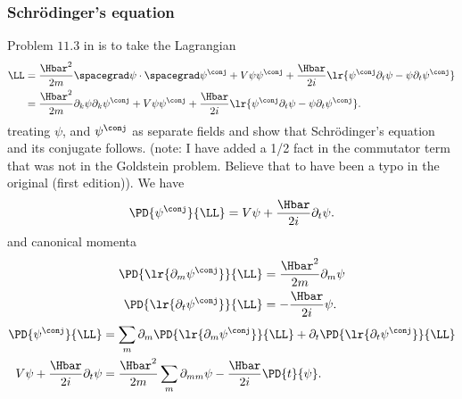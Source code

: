 %
%
%
\subsubsection{Schr\"{o}dinger's equation}
%
Problem \(11.3\) in \citep{goldstein1951cm} is to take the Lagrangian
%
\begin{equation}\label{eqn:fieldLagrangian:540}
\begin{aligned}
\LL
&= \frac{\Hbar^2}{2 m} \spacegrad \psi \cdot \spacegrad \psi^\conj + V \psi \psi^\conj + \frac{\Hbar}{2i}
\lr{  \psi^\conj \partial_t \psi - \psi \partial_t \psi^\conj  }
 \\
&= \frac{\Hbar^2}{2 m} \partial_k \psi \partial_k \psi^\conj + V \psi \psi^\conj +
\frac{\Hbar}{2i}
\lr{  \psi^\conj \partial_t \psi - \psi \partial_t \psi^\conj  }
 .
\end{aligned}
\end{equation}
%
treating \(\psi\), and \(\psi^\conj\) as separate fields and show that Schr\"{o}dinger's equation and its conjugate follows.  (note: I have added a 1/2 fact in the
commutator term that was not in the Goldstein problem.  Believe that to have been a typo in the original (first edition)).
%
We have
\begin{equation}\label{eqn:fieldLagrangian:560}
\PD{\psi^\conj}{\LL} = V\psi + \frac{\Hbar}{2i} \partial_t \psi .
\end{equation}
%
and canonical momenta
\begin{equation}\label{eqn:fieldLagrangian:580}
\begin{aligned}
\PD{
\lr{ \partial_m \psi^\conj }
}{\LL} &= \frac{\Hbar^2}{2 m} \partial_{m} \psi \\
\PD{
\lr{ \partial_t \psi^\conj }
}{\LL} &= -\frac{\Hbar}{2i} {\psi} .
\end{aligned}
\end{equation}
%
\begin{equation}\label{eqn:fieldLagrangian:600}
\begin{aligned}
\PD{\psi^\conj}{\LL} &= \sum_m \partial_m \PD{
\lr{ \partial_m \psi^\conj }
}{\LL} + \partial_t \PD{
\lr{ \partial_t \psi^\conj }
}{\LL} \\
V\psi + \frac{\Hbar}{2i} \partial_t \psi &= \frac{\Hbar^2}{2 m} \sum_m \partial_{mm} \psi -\frac{\Hbar}{2i} \PD{t}{\psi} .
\end{aligned}
\end{equation}
